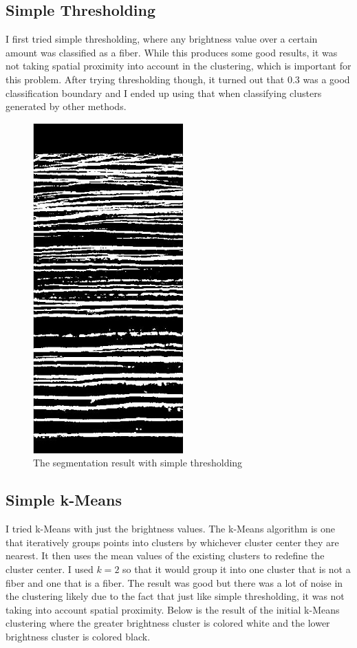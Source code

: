 \documentclass[11pt,psfig]{article}
\begin{document}
\subsection{Simple Thresholding}
I first tried simple thresholding, where any brightness value over a certain amount was classified as a fiber. While this produces some good results, it was not taking spatial proximity into account in the clustering, which is important for this problem. After trying thresholding though, it turned out that $0.3$ was a good classification boundary and I ended up using that when classifying clusters generated by other methods. \\
\begin{figure}[H]
\centering
\includegraphics[height=5in]{thresholdSegmentationResult.jpg}
\caption{The segmentation result with simple thresholding}
\end{figure}

\subsection{Simple k-Means}
I tried k-Means with just the brightness values. The k-Means algorithm is one that iteratively groups points into clusters by whichever cluster center they are nearest. It then uses the mean values of the existing clusters to redefine the cluster center. I used $k=2$ so that it would group it into one cluster that is not a fiber and one that is a fiber. The result was good but there was a lot of noise in the clustering likely due to the fact that just like simple thresholding, it was not taking into account spatial proximity. Below is the result of the initial k-Means clustering where the greater brightness cluster is colored white and the lower brightness cluster is colored black. 
\end{document}
